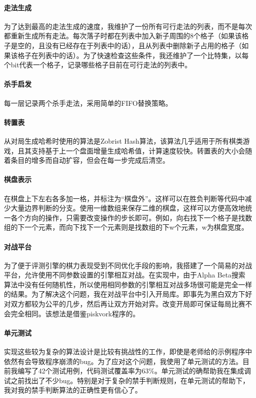 \documentclass{article}
\begin{document}
\paragraph{走法生成} 为了达到最高的走法生成的速度，我维护了一份所有可行走法的列表，而不是每次都重新生成所有走法。每次落子时都在列表中加入新子周围的8个格子（如果该格子是空的，且没有已经存在于列表中的话），且从列表中删除新子占用的格子（如果该格子在列表中的话）。为了快速检查这些条件，我还维护了一个比特集，以每个bit代表一个格子，记录哪些格子目前在可行走法的列表中。

\paragraph{杀手启发} 每一层记录两个杀手走法，采用简单的FIFO替换策略。

\paragraph{转置表} 从对局生成哈希时使用的算法是Zobrist Hash算法，该算法几乎适用于所有棋类游戏，且其支持基于上一个盘面增量生成哈希值，计算速度较快。转置表的大小会随着条目的增多而自动扩容，但会在每一步完成后清空。

\paragraph{棋盘表示} 在棋盘上下左右各多加一格，并标注为“棋盘外”。这样可以在胜负判断等代码中减少大量边界判断的分支。使用一维数组来保存二维的棋盘，这样可以方便高效地统一各个方向的操作，只需要改变操作的步长即可。例如，向右找下一个格子是找数组的下一个元素，而向下找下一个元素则是找数组的下w个元素，w为棋盘宽度。

\paragraph{对战平台} 为了便于评测引擎的棋力表现受到不同优化手段的影响，我搭建了一个简易的对战平台，允许使用不同参数设置的引擎相互对战。在实现中，由于Alpha Beta搜索算法中没有任何随机性，所以使用相同参数的引擎相互对战多场很可能是完全一样的结果。为了解决这个问题，我在对战平台中引入开局库。即事先为黑白双方下好对双方都较为公平的几步，然后再让双方开始对弈。改变开局即可保证每局比赛不会完全相同。该想法是借鉴piskvork程序的。

\paragraph{单元测试} 实现这些较为复杂的算法设计是比较有挑战性的工作，即使是老师给的示例程序中依然有会导致程序崩溃的bug。为了应对这个问题，我使用了单元测试的方法。目前我编写了42个测试用例，代码测试覆盖率为63\%。单元测试的确帮助我在集成调试之前找出了不少bug。特别是对于复杂的禁手判断规则，在单元测试的帮助下，我对我的禁手判断算法的正确性更有信心了。
\end{document}
